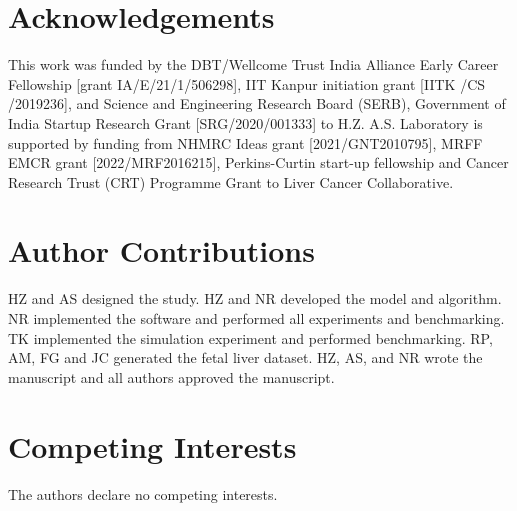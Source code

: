 \documentclass[preprint,11pt]{article}
\begin{document}
\section*{Acknowledgements}
This work was funded by the DBT/Wellcome Trust India Alliance Early Career Fellowship [grant IA/E/21/1/506298], IIT Kanpur initiation grant [IITK /CS /2019236], and Science and Engineering Research Board (SERB), Government of India Startup Research Grant [SRG/2020/001333] to H.Z. A.S. Laboratory is supported by funding from NHMRC Ideas grant [2021/GNT2010795], MRFF EMCR grant [2022/MRF2016215], Perkins-Curtin start-up fellowship and Cancer Research Trust (CRT) Programme Grant to Liver Cancer Collaborative.

\section*{Author Contributions}
HZ and AS designed the study. HZ and NR developed the model and algorithm. NR implemented the software and performed all experiments and benchmarking. TK implemented the simulation experiment and performed benchmarking. RP, AM, FG and JC generated the fetal liver dataset. HZ, AS, and NR wrote the manuscript and all authors approved the manuscript.


\section*{Competing Interests}
The authors declare no competing interests.


{\scriptsize
	
}
\endgroup
%

%
\end{document}
